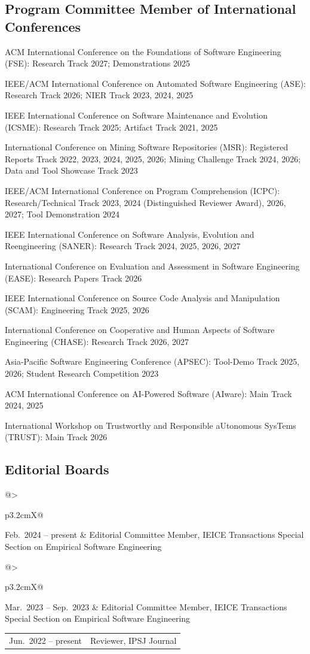 \documentclass[10pt,a4paper]{article}
\makeatletter
\newcommand{\entry}[2]{%
  \noindent\begin{tabularx}{\linewidth}{@{}>{\raggedright\arraybackslash}p{3.2cm}X@{}}#1 & #2\end{tabularx}\par\vspace{3pt}}
\makeatother
\begin{document}
\subsection{Program Committee Member of International Conferences}
\begin{plainlist}
  \item ACM International Conference on the Foundations of Software Engineering (FSE): Research Track 2027; Demonstrations 2025
  \item IEEE/ACM International Conference on Automated Software Engineering (ASE): Research Track 2026; NIER Track 2023, 2024, 2025
  \item IEEE International Conference on Software Maintenance and Evolution (ICSME): Research Track 2025; Artifact Track 2021, 2025
  \item International Conference on Mining Software Repositories (MSR): Registered Reports Track 2022, 2023, 2024, 2025, 2026; Mining Challenge Track 2024, 2026; Data and Tool Showcase Track 2023
  \item IEEE/ACM International Conference on Program Comprehension (ICPC): Research/Technical Track 2023, 2024 (Distinguished Reviewer Award), 2026, 2027; Tool Demonstration 2024
  \item IEEE International Conference on Software Analysis, Evolution and Reengineering (SANER): Research Track 2024, 2025, 2026, 2027
  \item International Conference on Evaluation and Assessment in Software Engineering (EASE): Research Papers Track 2026
  \item IEEE International Conference on Source Code Analysis and Manipulation (SCAM): Engineering Track 2025, 2026
  \item International Conference on Cooperative and Human Aspects of Software Engineering (CHASE): Research Track 2026, 2027
  \item Asia-Pacific Software Engineering Conference (APSEC): Tool-Demo Track 2025, 2026; Student Research Competition 2023
  \item ACM International Conference on AI-Powered Software (AIware): Main Track 2024, 2025
  \item International Workshop on Trustworthy and Responsible aUtonomous SysTems (TRUST): Main Track 2026
\end{plainlist}

\subsection{Editorial Boards}
\entry{Feb.\ 2024 -- present}{Editorial Committee Member, IEICE Transactions Special Section on Empirical Software Engineering}
\entry{Mar.\ 2023 -- Sep.\ 2023}{Editorial Committee Member, IEICE Transactions Special Section on Empirical Software Engineering}
\entry{Jun.\ 2022 -- present}{Reviewer, IPSJ Journal}
\end{document}
